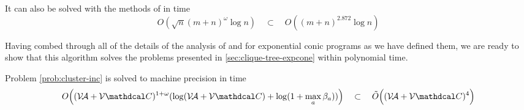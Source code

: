 \documentclass{article}
\begin{document}
\begin{conj}
\color{red}
    It can also be solved with the methods of \textcite{skajaa2015homogeneous} in
    time
    \[ O(\sqrt{n} (m+n)^\omega \log n ) 
        \quad\subset\quad O( (m+n)^{2.872} \log n ) 
        \]
\end{conj}

Having combed through all of the details of the analysis of  \textcite{badenbroek2021algorithm} and \textcite{nesterov1996infeasible} for exponential
conic programs as we have defined them, we are ready to show that this algorithm solves the problems presented in \cref{sec:clique-tree-expcone} within polynomial time. 

\begin{lemma}\label{lem:cluster-inc-polytime}
Problem \eqref{prob:cluster-inc} is solved to machine precision in time
\[
    O\Big( (\V\!\Ar + \V\C)^{1 + \omega} ( \log (\V\!\Ar + \V\C) 
        + \log(1+ \max_a\beta_a)) \Big)
    \quad \subset \quad
        \tilde O\Big( (\V\!\Ar + \V\C)^4 \Big)
\]
\end{lemma}
\end{document}
